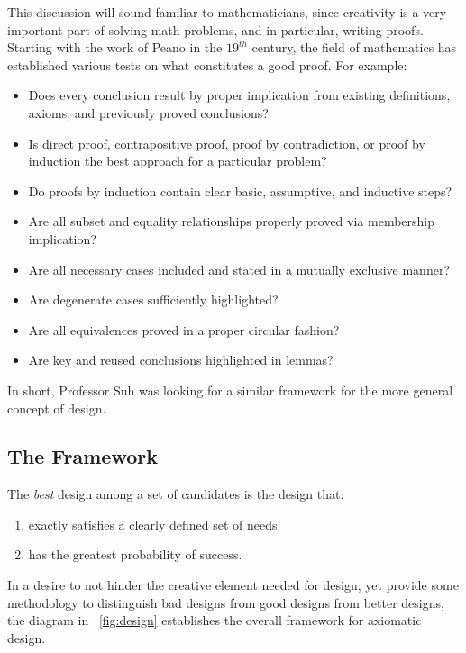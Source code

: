 This discussion will sound familiar to mathematicians, since creativity is a very important part of solving math
problems, and in particular, writing proofs.  Starting with the work of Peano in the \(19^{th}\) century, the field
of mathematics has established various tests on what constitutes a good proof.  For example:
\begin{itemize}
\item Does every conclusion result by proper implication from existing definitions, axioms, and previously proved
  conclusions?
\item Is direct proof, contrapositive proof, proof by contradiction, or proof by induction the best approach for a
  particular problem?
\item Do proofs by induction contain clear basic, assumptive, and inductive steps?
\item Are all subset and equality relationships properly proved via membership implication?
\item Are all necessary cases included and stated in a mutually exclusive manner?
\item Are degenerate cases sufficiently highlighted?
\item Are all equivalences proved in a proper circular fashion?
\item Are key and reused conclusions highlighted in lemmas?
\end{itemize}
In short, Professor Suh was looking for a similar framework for the more general concept of design.

\subsection{The Framework}\label{sec:sub:framework}

The \emph{best} design among a set of candidates is the design that:
\begin{enumerate}
\item exactly satisfies a clearly defined set of needs.
\item has the greatest probability of success.
\end{enumerate}

In a desire to not hinder the creative element needed for design, yet provide some methodology to distinguish bad
designs from good designs from better designs, the diagram in \figurename~\ref{fig:design} establishes the overall
framework for axiomatic design.

